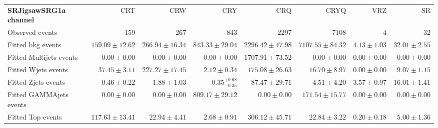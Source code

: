 

\begin{table}
\begin{center}
\setlength{\tabcolsep}{0.0pc}
{\tiny
\begin{tabular*}{\textwidth}{@{\extracolsep{\fill}}lrrrrrrr}
\noalign{\smallskip}\hline\noalign{\smallskip}
{\bf SRJigsawSRG1a channel}           & CRT            & CRW            & CRY            & CRQ            & CRYQ            & VRZ            & SR              \\[-0.05cm]
\noalign{\smallskip}\hline\noalign{\smallskip}
Observed events          & $159$              & $267$              & $843$              & $2297$              & $7108$              & $4$              & $32$                    \\
\noalign{\smallskip}\hline\noalign{\smallskip}
Fitted bkg events         & $159.09 \pm 12.62$          & $266.94 \pm 16.34$          & $843.33 \pm 29.04$          & $2296.42 \pm 47.98$          & $7107.55 \pm 84.32$          & $4.13 \pm 1.03$          & $32.01 \pm 2.55$              \\
\noalign{\smallskip}\hline\noalign{\smallskip}
        Fitted Multijets events         & $0.00 \pm 0.00$          & $0.00 \pm 0.00$          & $0.00 \pm 0.00$          & $1707.91 \pm 73.52$          & $0.00 \pm 0.00$          & $0.00 \pm 0.00$          & $0.00 \pm 0.00$              \\
        Fitted Wjets events         & $37.45 \pm 3.11$          & $227.27 \pm 17.45$          & $2.12 \pm 0.34$          & $175.08 \pm 26.63$          & $16.70 \pm 8.97$          & $0.00 \pm 0.00$          & $9.07 \pm 1.15$              \\
        Fitted Zjets events         & $0.46 \pm 0.22$          & $1.88 \pm 1.03$          & $0.35_{-0.35}^{+0.68}$          & $87.47 \pm 29.71$          & $4.51 \pm 4.20$          & $3.57 \pm 0.97$          & $16.01 \pm 1.41$              \\
        Fitted GAMMAjets events         & $0.00 \pm 0.00$          & $0.00 \pm 0.00$          & $809.17 \pm 29.12$          & $0.00 \pm 0.00$          & $171.54 \pm 15.77$          & $0.00 \pm 0.00$          & $0.00 \pm 0.00$              \\
        Fitted Top events         & $117.63 \pm 13.41$          & $22.94 \pm 4.41$          & $2.68 \pm 0.91$          & $306.12 \pm 45.71$          & $22.84 \pm 3.22$          & $0.20 \pm 0.18$          & $5.00 \pm 1.36$              \\

\end{tabular*}}
\end{center}
\end{table}
